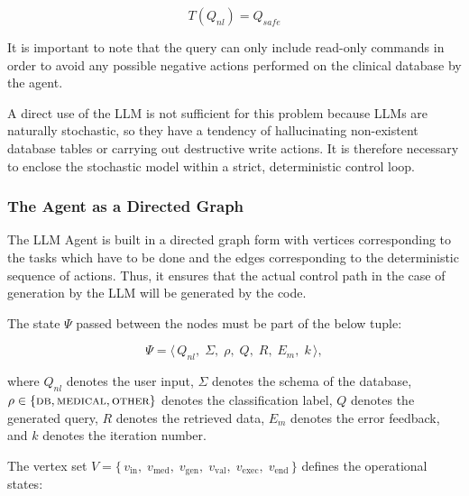 \begin{equation}
    T(Q_{nl}) = Q_{safe}
    \label{eq:translation}
\end{equation}

It is important to note that the query can only include read-only commands in order to avoid any possible negative actions performed on the clinical database by the agent.

A direct use of the LLM is not sufficient for this problem because LLMs are naturally stochastic, so they have a tendency of hallucinating non-existent database tables or carrying out destructive write actions. It is therefore necessary to enclose the stochastic model within a strict, deterministic control loop.

\subsubsection*{The Agent as a Directed Graph}

The LLM Agent is built in a directed graph form with vertices corresponding to the tasks which have to be done and the edges corresponding to the deterministic sequence of actions. Thus, it ensures that the actual control path in the case of generation by the LLM will be generated by the code.

\vspace{1em}

The state $\Psi$ passed between the nodes must be part of the below tuple:

\begin{equation}
    \Psi = \langle\, Q_{nl},\; \Sigma,\; \rho,\; Q,\; R,\; E_m,\; k \,\rangle,
    \label{eq:state}
\end{equation}

where $Q_{nl}$ denotes the user input, $\Sigma$ denotes the schema of the database, $\rho \in \{\textsc{db}, \textsc{medical}, \textsc{other}\}$ denotes the classification label, $Q$ denotes the generated query, $R$ denotes the retrieved data, $E_m$ denotes the error feedback, and $k$ denotes the iteration number.

The vertex set $V = \{\, v_{\mathrm{in}},\; v_{\mathrm{med}},\; v_{\mathrm{gen}},\; v_{\mathrm{val}},\; v_{\mathrm{exec}},\; v_{\mathrm{end}} \,\}$ defines the operational states:

